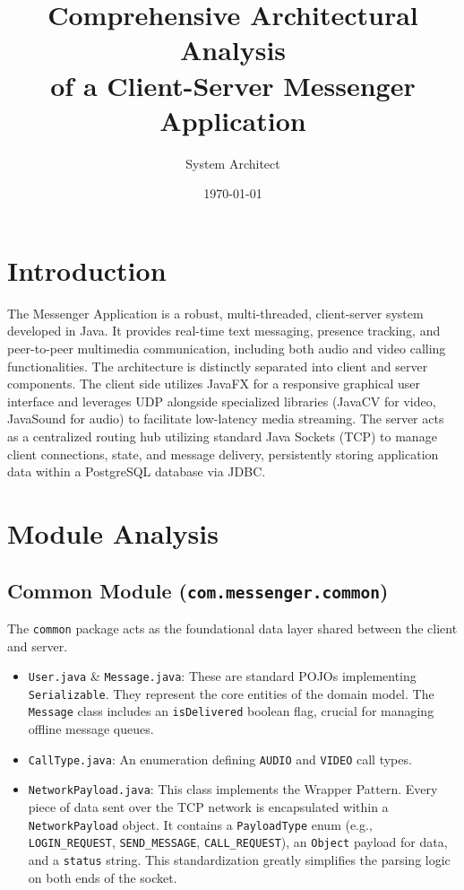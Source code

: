 \documentclass[12pt,a4paper]{article}
\title{Comprehensive Architectural Analysis \\ of a Client-Server Messenger Application}
\author{System Architect}
\date{\today}
\begin{document}
\maketitle
\thispagestyle{empty}

\newpage
\tableofcontents
\newpage

\section{Introduction}
The Messenger Application is a robust, multi-threaded, client-server system developed in Java. It provides real-time text messaging, presence tracking, and peer-to-peer multimedia communication, including both audio and video calling functionalities. The architecture is distinctly separated into client and server components. The client side utilizes JavaFX for a responsive graphical user interface and leverages UDP alongside specialized libraries (JavaCV for video, JavaSound for audio) to facilitate low-latency media streaming. The server acts as a centralized routing hub utilizing standard Java Sockets (TCP) to manage client connections, state, and message delivery, persistently storing application data within a PostgreSQL database via JDBC.

\section{Module Analysis}

\subsection{Common Module (\texttt{com.messenger.common})}
The \texttt{common} package acts as the foundational data layer shared between the client and server.
\begin{itemize}
    \item \texttt{User.java} \& \texttt{Message.java}: These are standard POJOs implementing \texttt{Serializable}. They represent the core entities of the domain model. The \texttt{Message} class includes an \texttt{isDelivered} boolean flag, crucial for managing offline message queues.
    \item \texttt{CallType.java}: An enumeration defining \texttt{AUDIO} and \texttt{VIDEO} call types.
    \item \texttt{NetworkPayload.java}: This class implements the Wrapper Pattern. Every piece of data sent over the TCP network is encapsulated within a \texttt{NetworkPayload} object. It contains a \texttt{PayloadType} enum (e.g., \texttt{LOGIN\_REQUEST}, \texttt{SEND\_MESSAGE}, \texttt{CALL\_REQUEST}), an \texttt{Object} payload for data, and a \texttt{status} string. This standardization greatly simplifies the parsing logic on both ends of the socket.
\end{itemize}
\end{document}
